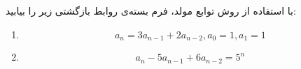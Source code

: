 \EXERCISE
با استفاده از روش توابع مولد، فرم بسته‌ی روابط بازگشتی زیر را بیابید:
\begin{enumerate}
\item
$$a_n = 3a_{n-1} + 2a_{n-2}, a_0 = 1, a_1 = 1$$
\item
$$a_n - 5a_{n-1} + 6a_{n-2} = 5^n$$
\end{enumerate}